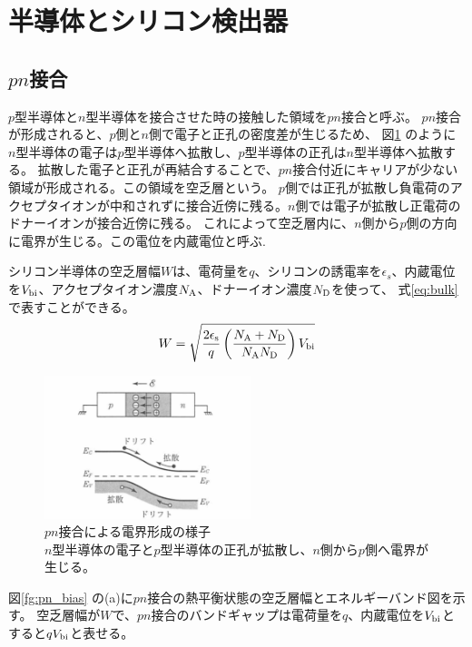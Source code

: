 \section{半導体とシリコン検出器}
\subsection{$pn$接合}
$p$型半導体と$n$型半導体を接合させた時の接触した領域を$pn$接合と呼ぶ。
$pn$接合が形成されると、$p$側と$n$側で電子と正孔の密度差が生じるため、 図\ref{fg:pn} のように
$n$型半導体の電子は$p$型半導体へ拡散し、$p$型半導体の正孔は$n$型半導体へ拡散する。
拡散した電子と正孔が再結合することで、$pn$接合付近にキャリアが少ない領域が形成される。この領域を空乏層という。
$p$側では正孔が拡散し負電荷のアクセプタイオンが中和されずに接合近傍に残る。$n$側では電子が拡散し正電荷のドナーイオンが接合近傍に残る。
これによって空乏層内に、$n$側から$p$側の方向に電界が生じる。この電位を内蔵電位と呼ぶ.

シリコン半導体の空乏層幅$W$は、電荷量を$q$、シリコンの誘電率を$\epsilon_s$、内蔵電位を$V_{\rm{bi}}$、アクセプタイオン濃度$N_{\rm{A}}$、ドナーイオン濃度$N_{\rm{D}}$を使って、
式\ref{eq:bulk} で表すことができる\cite{sze2012semiconductor}。
\begin{equation}
    W = \sqrt{\frac{2\epsilon_{\rm{s}}}{q}\left(\frac{N_{\rm{A}}+N_{\rm{D}}}{N_{\rm{A}} N_{\rm{D}}}\right)V_{\rm{bi}}}
    \label{eq:bulk}
\end{equation}

\begin{figure}[h]
    \centering
    \includegraphics[width=6cm]{fig/ch2/pn.jpg}
    \caption[$pn$接合による電界形成の様子\cite{sze2012semiconductor}]{$pn$接合による電界形成の様子\cite{sze2012semiconductor}\\$n$型半導体の電子と$p$型半導体の正孔が拡散し、$n$側から$p$側へ電界が生じる。}
    \label{fg:pn}
\end{figure}

図\ref{fg:pn_bias} の(a)に$pn$接合の熱平衡状態の空乏層幅とエネルギーバンド図を示す。
空乏層幅が$W$で、$pn$接合のバンドギャップは電荷量を$q$、内蔵電位を$V_{\rm{bi}}$とすると$qV_{\rm{bi}}$と表せる。

